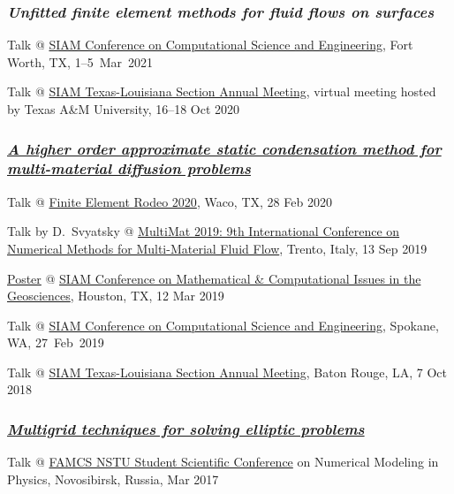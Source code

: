 \documentclass[a4paper,12pt]{article}
\begin{document}
	\subsubsection*{\textit{Unfitted finite element methods for fluid flows on surfaces}}
	\begin{etaremune}[topsep=0pt]
		\item Talk @ \href{https://www.siam.org/conferences/cm/conference/cse21}{SIAM Conference on Computational Science and Engineering}, Fort Worth, TX, 1--5~Mar~2021
		\item Talk @ \href{https://www.math.tamu.edu/conferences/SIAMTXLA/}{SIAM Texas-Louisiana Section Annual Meeting}, virtual meeting
		hosted by Texas A\&M University, 16--18 Oct 2020
	\end{etaremune}
	\subsubsection*{\textit{\href{https://www.researchgate.net/publication/335880120_A_higher_order_approximate_static_condensation_method_for_multi-material_diffusion_problems}{A higher order approximate static condensation method for multi-material diffusion problems}}}	
	\begin{etaremune}[resume]
		\item Talk @ \href{https://www.baylor.edu/math/index.php?id=966337}{Finite Element Rodeo 2020}, Waco, TX, 28 Feb 2020
		\item Talk by D.~Svyatsky @ \href{https://webmagazine.unitn.it/en/evento/dicam/44676/multimat2019}{MultiMat 2019: 9th International Conference on Numerical Methods for Multi-Material Fluid Flow}, Trento, Italy, 13 Sep 2019	
		\item \href{https://www.researchgate.net/publication/331674777_Generalized_approximate_static_condensation_method_for_a_heterogeneous_multi-material_diffusion_problem}{Poster} @ \href{https://www.siam.org/Conferences/CM/Main/gs19}{SIAM Conference on Mathematical \& Computational Issues in the Geosciences}, Houston, TX, 12 Mar 2019
		\item Talk @ \href{https://www.siam.org/Conferences/CM/Main/cse19}{SIAM Conference on Computational Science and Engineering}, Spokane, WA, 27~Feb~2019
		\item Talk @ \href{https://www.siam.org/Conferences/CM/Main/txla18}{SIAM Texas-Louisiana Section Annual Meeting}, Baton Rouge, LA, 7 Oct 2018
	\end{etaremune}
	\subsubsection*{\textit{\href{https://www.researchgate.net/publication/316884102_Mnogosetocnye_metody_resenia_ellipticeskih_zadac}{Multigrid techniques for solving elliptic problems}}}	
	\begin{etaremune}[resume]		
		\item Talk @ \href{https://ami.nstu.ru/o-fakultete/news/1699/}{FAMCS NSTU Student Scientific Conference} on Numerical Modeling in Physics, Novosibirsk, Russia, Mar 2017
	\end{etaremune}
\end{document}

